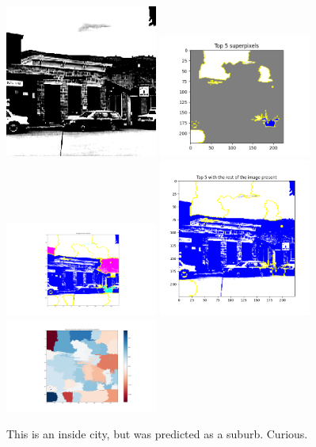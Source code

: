 \begin{figure}[h]
    \centering
    \includegraphics[width=5cm]{suburb-should-insidecity.png}
    \includegraphics[width=5cm]{lime-suburb-should-insidecity.png}
    \includegraphics[width=5cm]{procon-suburb-should-insidecity.png}
    \includegraphics[width=5cm]{top5-suburb-should-inside-city.png}
    \includegraphics[width=5cm]{weight-suburb-should-insidecity.png}
    \caption{This is an inside city, but was predicted as a suburb.  Curious.}
    \label{fig:result1}
\end{figure}



